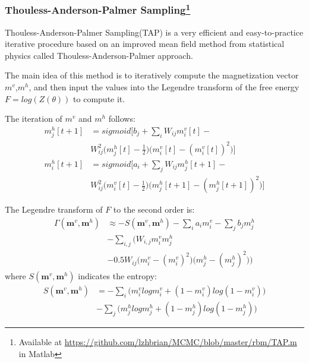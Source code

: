 
\subsubsection{Thouless-Anderson-Palmer Sampling\protect\footnote{Available at \protect\url{https://github.com/lzhbrian/MCMC/blob/master/rbm/TAP.m} in Matlab}}

Thouless-Anderson-Palmer Sampling(TAP)\cite{gabrie2015training} is a very efficient and easy-to-practice iterative procedure based on an improved mean field method from statistical physics called Thouless-Anderson-Palmer approach.

The main idea of this method is to iteratively compute the magnetization vector $m^{v}$,$m^{h}$, and then input the values into the Legendre transform of the free energy $F=log(Z(\theta))$ to compute it.

The iteration of $m^{v}$ and $m^{h}$ follows:
\begin{equation}
\begin{aligned}
m^{h}_{j}{[t+1]} & = sigmoid\Bigg[b_{j} + \sum_{i}W_{ij}m^{v}_{i}{[t]} - \\
& W^{2}_{ij} \Bigg(m^{h}_{j}{[t] - \frac{1}{2}} \Bigg) \Big(m^{v}_{i}{[t]}-(m^{v}_{i}{[t]})^{2} \Big) \Bigg] \\ 
m^{h}_{i}{[t+1]} & = sigmoid\Bigg[a_{i} + \sum_{j}W_{ij}m^{h}_{j}{[t+1]} - \\
& W^{2}_{ij} \Bigg(m^{v}_{i}{[t] - \frac{1}{2}} \Bigg) \Big(m^{h}_{j}{[t+1]}-(m^{h}_{j}{[t+1]})^{2} \Big) \Bigg]
\end{aligned}
\end{equation}

The Legendre transform of $F$ to the second order is:
\begin{equation}
\begin{split}
\Gamma(\mathbf m^{v},\mathbf m^{h}) &\approx - S(\mathbf m^{v},\mathbf m^{h}) - \sum_{i} a_{i}m^{v}_{i} - \sum_{j} b_{j}m^{h}_{j} \\
& - \sum_{i,j} \Bigg( W_{i,j}m^{v}_{i}m^{h}_{j} \\
& - 0.5W_{ij}\Big(m^{v}_{i}-(m^{v}_{i})^2\Big)\Big(m^{h}_{j}-(m^{h}_{j})^2\Big) \Bigg)
\end{split}
\end{equation}
where $S(\mathbf m^{v},\mathbf m^{h})$ indicates the entropy:
\begin{equation}
\begin{split}
S(\mathbf m^{v},\mathbf m^{h}) &= - \sum_{i} \Bigg(m^{v}_{i}logm^{v}_{i} + (1-m^{v}_{i})log(1-m^{v}_{i}) \Bigg) \\
&- \sum_{j} \Bigg(m^{h}_{j}logm^{h}_{j} + (1-m^{h}_{j})log(1-m^{h}_{j}) \Bigg)
\end{split}
\end{equation}

